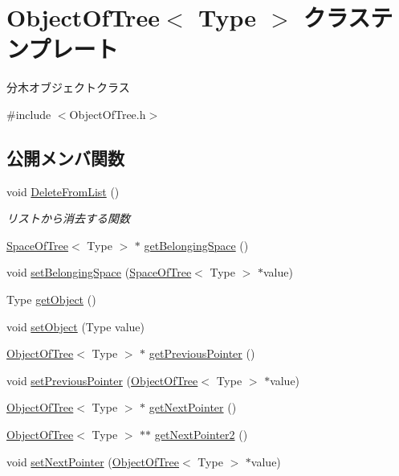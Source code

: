 \hypertarget{class_object_of_tree}{}\section{Object\+Of\+Tree$<$ Type $>$ クラステンプレート}
\label{class_object_of_tree}


分木オブジェクトクラス  




{\ttfamily \#include $<$Object\+Of\+Tree.\+h$>$}

\subsection*{公開メンバ関数}
\begin{DoxyCompactItemize}
\item 
void \mbox{\hyperlink{class_object_of_tree_a1356595b29749ca4555ca61a5bb30388}{Delete\+From\+List}} ()
\begin{DoxyCompactList}\small\item\em リストから消去する関数 \end{DoxyCompactList}\item 
\mbox{\hyperlink{class_space_of_tree}{Space\+Of\+Tree}}$<$ Type $>$ $\ast$ \mbox{\hyperlink{class_object_of_tree_a94c5724ddb841da0bb31ab6ae63df304}{get\+Belonging\+Space}} ()
\item 
void \mbox{\hyperlink{class_object_of_tree_a21dc9105d1a5a0d045dc43894bba3c1c}{set\+Belonging\+Space}} (\mbox{\hyperlink{class_space_of_tree}{Space\+Of\+Tree}}$<$ Type $>$ $\ast$value)
\item 
Type \mbox{\hyperlink{class_object_of_tree_a28214e15fffb72cb50b764e2f3ac863d}{get\+Object}} ()
\item 
void \mbox{\hyperlink{class_object_of_tree_aae14cb0e8ac8b701de737c547a1d3b8c}{set\+Object}} (Type value)
\item 
\mbox{\hyperlink{class_object_of_tree}{Object\+Of\+Tree}}$<$ Type $>$ $\ast$ \mbox{\hyperlink{class_object_of_tree_a02b74f20b90ec53dbae2d18648a9d5d1}{get\+Previous\+Pointer}} ()
\item 
void \mbox{\hyperlink{class_object_of_tree_aa0ec8f6f61eb41f346796141e8ec38d5}{set\+Previous\+Pointer}} (\mbox{\hyperlink{class_object_of_tree}{Object\+Of\+Tree}}$<$ Type $>$ $\ast$value)
\item 
\mbox{\hyperlink{class_object_of_tree}{Object\+Of\+Tree}}$<$ Type $>$ $\ast$ \mbox{\hyperlink{class_object_of_tree_a596be7ee8c6e26a104bed5d26f7cf54e}{get\+Next\+Pointer}} ()
\item 
\mbox{\hyperlink{class_object_of_tree}{Object\+Of\+Tree}}$<$ Type $>$ $\ast$$\ast$ \mbox{\hyperlink{class_object_of_tree_a1b5839c677aa3c678733c1aa03d4f00f}{get\+Next\+Pointer2}} ()
\item 
void \mbox{\hyperlink{class_object_of_tree_a44fb225ed189197bcdfe23dcd2a7fe28}{set\+Next\+Pointer}} (\mbox{\hyperlink{class_object_of_tree}{Object\+Of\+Tree}}$<$ Type $>$ $\ast$value)
\end{DoxyCompactItemize}



